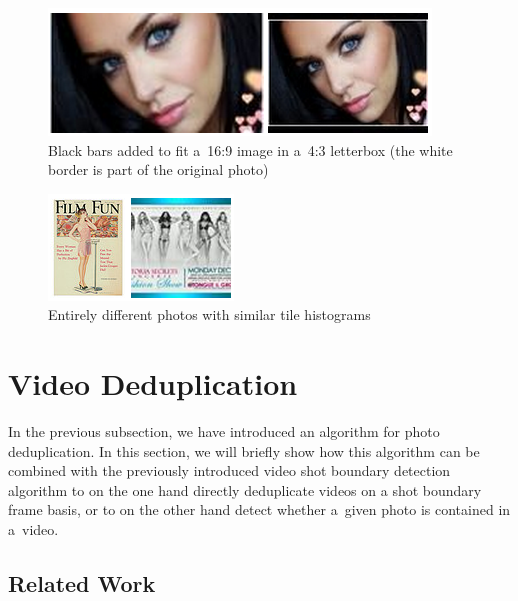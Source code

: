 \begin{figure}[h!]
  \centering
  \includegraphics[width=0.55\linewidth]{./bwtolerance.png}
  \caption[Black bars added to fit a~16:9 image in a~4:3 letterbox]
    {Black bars added to fit a~16:9 image in a~4:3 letterbox
    (the white border is part of the original photo)}
  \label{fig:bwtolerance}
\end{figure}

\begin{figure}[h!]
  \centering
  \includegraphics[width=0.4\linewidth]{./weakness.png}
  \caption{Entirely different photos with similar tile histograms}
  \label{fig:weakness}
\end{figure}

\section{Video Deduplication}

In the previous subsection, we have introduced
an algorithm for photo deduplication.
In this section, we will briefly show how this algorithm
can be combined with the previously introduced
video shot boundary detection algorithm to on the one hand
directly deduplicate videos on a shot boundary frame basis,
or to on the other hand detect
whether a~given photo is contained in a~video.

\subsection{Related Work}

